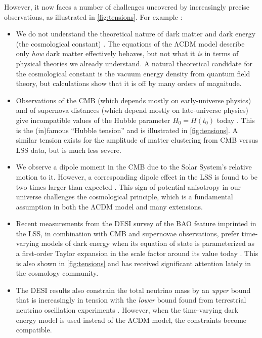 \documentclass[USenglish, thumbmarks]{uiophdthesis} %
\newcommand\LCDM{\ensuremath{\mathrm{\Lambda CDM}}}
\begin{document}
However,
it now faces a number of challenges uncovered by increasingly precise observations,
as illustrated in \cref{fig:tensions}.
For example
\cite{bullLCDMProblemsSolutions2016,abdallaCosmologyIntertwinedReview2022a,perivolaropoulosChallengesCDMUpdate2022b}:
\begin{itemize}
\item
We do not understand the theoretical nature of dark matter and dark energy (the cosmological constant)
\cite[e.g.][]{cirelliDarkMatter2026,weinbergCosmologicalConstantProblem1989,perivolaropoulosChallengesCDMUpdate2022b}.
The equations of the \LCDM{} model describe only \emph{how} dark matter effectively behaves,
but not what it \emph{is} in terms of physical theories we already understand.
A natural theoretical candidate for the cosmological constant is the vacuum energy density from quantum field theory,
but calculations show that it is off by many orders of magnitude.

\item
Observations of the CMB (which depends mostly on early-universe physics)
and of supernova distances (which depend mostly on late-universe physics)
give incompatible values of the Hubble parameter $H_0 = H(t_0)$ today
\cite[e.g.][]{perivolaropoulosChallengesCDMUpdate2022b}.
This is the (in)famous \enquote{Hubble tension} and is illustrated in \cref{fig:tensions}.
A similar tension exists for the amplitude of matter clustering from CMB versus LSS data,
but is much less severe.

\item
We observe a dipole moment in the CMB due to the Solar System's relative motion to it.
However, a corresponding dipole effect in the LSS is found to be two times larger than expected
\cite{secrestTestCosmologicalPrinciple2021}.
This sign of potential anisotropy in our universe challenges the cosmological principle,
which is a fundamental assumption in both the \LCDM{} model and many extensions.

\item
Recent measurements from the DESI survey of the BAO feature imprinted in the LSS,
in combination with CMB and supernovae observations,
prefer time-varying models of dark energy when its equation of state is
parameterized as a first-order Taylor expansion in the scale factor around its value today
\cite{collaborationDESI2024VI2025,collaborationDESIDR2Results2025}.
This is also shown in \cref{fig:tensions}
and has received significant attention lately in the cosmology community.

\item
The DESI results also constrain the total neutrino mass by an \emph{upper} bound
that is increasingly in tension with the \emph{lower} bound found from terrestrial neutrino oscillation experiments
\cite{collaborationDESI2024VI2025,collaborationDESIDR2Results2025}.
However, when the time-varying dark energy model is used instead of the \LCDM{} model,
the constraints become compatible.
\end{itemize}
\end{document}
